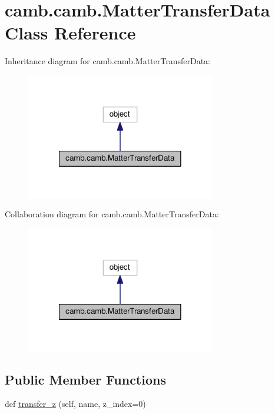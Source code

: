 \hypertarget{classcamb_1_1camb_1_1MatterTransferData}{}\section{camb.\+camb.\+Matter\+Transfer\+Data Class Reference}
\label{classcamb_1_1camb_1_1MatterTransferData}


Inheritance diagram for camb.\+camb.\+Matter\+Transfer\+Data\+:
\nopagebreak
\begin{figure}[H]
\begin{center}
\leavevmode
\includegraphics[width=234pt]{classcamb_1_1camb_1_1MatterTransferData__inherit__graph}
\end{center}
\end{figure}


Collaboration diagram for camb.\+camb.\+Matter\+Transfer\+Data\+:
\nopagebreak
\begin{figure}[H]
\begin{center}
\leavevmode
\includegraphics[width=234pt]{classcamb_1_1camb_1_1MatterTransferData__coll__graph}
\end{center}
\end{figure}
\subsection*{Public Member Functions}
\begin{DoxyCompactItemize}
\item 
def \mbox{\hyperlink{classcamb_1_1camb_1_1MatterTransferData_a6458b95625015d92c9bf21498c2edba8}{transfer\+\_\+z}} (self, name, z\+\_\+index=0)
\end{DoxyCompactItemize}


